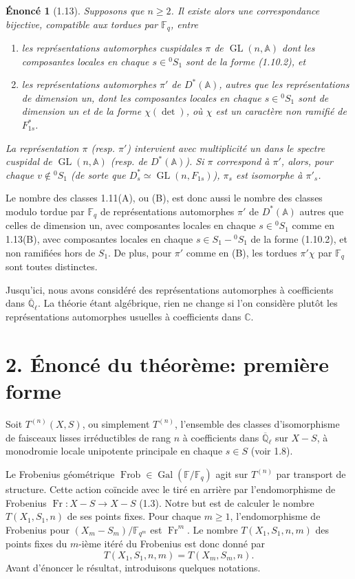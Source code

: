 \documentclass[10pt]{article}
\newcommand{\Fq}{\mathbb F_q}
\newcommand{\Fqm}{\mathbb F_{q^m}}
\newcommand{\Fb}{\mathbb F}
\newcommand{\Ql}{\overline{\mathbb Q}_{\ell}}
\newcommand{\C}{\mathbb C}
\newcommand{\Adele}{\mathbb A}
\newcommand{\GL}{\operatorname{GL}}
\newcommand{\Gal}{\operatorname{Gal}}
\newcommand{\Fr}{\operatorname{Fr}}
\newcommand{\Frob}{\operatorname{Frob}}
\newcommand{\detm}{\operatorname{det}}
\theoremstyle{deligne}
\newtheorem*{statement*}{Énoncé}
\newcommand{\heading}[1]{\vspace{0.7em}\noindent{\bfseries #1}\quad}
\begin{document}
\begin{statement*}[1.13]
Supposons que $n\ge2$. Il existe alors une correspondance bijective, compatible aux tordues par $\Fq$, entre
\begin{enumerate}[label=(\Alph*)]
\item les représentations automorphes cuspidales $\pi$ de $\GL(n,\Adele)$ dont les composantes locales en chaque $s\in{}^0S_1$ sont de la forme (1.10.2), et
\item les représentations automorphes $\pi'$ de $D^*(\Adele)$, autres que les représentations de dimension un, dont les composantes locales en chaque $s\in{}^0S_1$ sont de dimension un et de la forme $\chi(\detm)$, où $\chi$ est un caractère non ramifié de $F^*_{1s}$.
\end{enumerate}
La représentation $\pi$ (resp. $\pi'$) intervient avec multiplicité un dans le spectre cuspidal de $\GL(n,\Adele)$ (resp. de $D^*(\Adele)$). Si $\pi$ correspond à $\pi'$, alors, pour chaque $v\notin{}^0S_1$ (de sorte que $D^*_s\simeq\GL(n,F_{1s})$), $\pi_s$ est isomorphe à $\pi'_s$.
\end{statement*}

Le nombre des classes 1.11(A), ou (B), est donc aussi le nombre des classes modulo tordue par $\Fq$ de représentations automorphes $\pi'$ de $D^*(\Adele)$ autres que celles de dimension un, avec composantes locales en chaque $s\in{}^0S_1$ comme en 1.13(B), avec composantes locales en chaque $s\in S_1-{}^0S_1$ de la forme (1.10.2), et non ramifiées hors de $S_1$. De plus, pour $\pi'$ comme en (B), les tordues $\pi'\chi$ par $\Fq$ sont toutes distinctes.

Jusqu'ici, nous avons considéré des représentations automorphes à coefficients dans $\Ql$. La théorie étant algébrique, rien ne change si l'on considère plutôt les représentations automorphes usuelles à coefficients dans $\C$.

\section*{2. Énoncé du théorème: première forme}

\heading{2.1.} Soit $T^{(n)}(X,S)$, ou simplement $T^{(n)}$, l'ensemble des classes d'isomorphisme de faisceaux lisses irréductibles de rang $n$ à coefficients dans $\Ql$ sur $X-S$, à monodromie locale unipotente principale en chaque $s\in S$ (voir 1.8).

Le Frobenius géométrique $\Frob\in\Gal(\Fb/\Fq)$ agit sur $T^{(n)}$ par transport de structure. Cette action coïncide avec le tiré en arrière par l'endomorphisme de Frobenius $\Fr:X-S\to X-S$ (1.3). Notre but est de calculer le nombre $T(X_1,S_1,n)$ de ses points fixes. Pour chaque $m\ge1$, l'endomorphisme de Frobenius pour $(X_m-S_m)/\Fqm$ est $\Fr^m$. Le nombre $T(X_1,S_1,n,m)$ des points fixes du $m$-ième itéré du Frobenius est donc donné par
\begin{equation}\tag{2.1.1}
T(X_1,S_1,n,m)=T(X_m,S_m,n).
\end{equation}
Avant d'énoncer le résultat, introduisons quelques notations.
\end{document}
